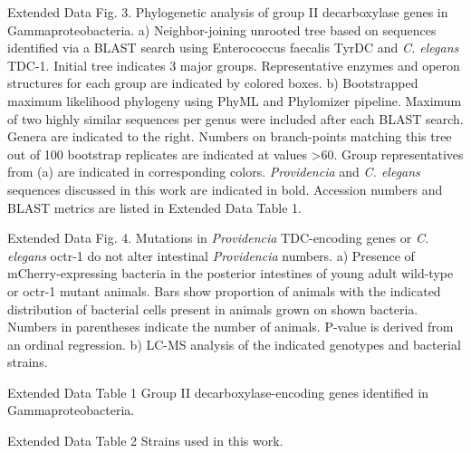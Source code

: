 \documentclass[]{article}
\begin{document}
Extended Data Fig. 3. Phylogenetic analysis of group II decarboxylase
genes in Gammaproteobacteria. a) Neighbor-joining unrooted tree based on
sequences identified via a BLAST search using Enterococcus faecalis
TyrDC and \textit{C. elegans} TDC-1. Initial tree indicates 3 major
groups. Representative enzymes and operon structures for each group are
indicated by colored boxes. b) Bootstrapped maximum likelihood phylogeny
using PhyML and Phylomizer pipeline. Maximum of two highly similar
sequences per genus were included after each BLAST search. Genera are
indicated to the right. Numbers on branch-points matching this tree out
of 100 bootstrap replicates are indicated at values \textgreater{}60.
Group representatives from (a) are indicated in corresponding colors.
\textit{Providencia} and \textit{C. elegans} sequences discussed in this
work are indicated in bold. Accession numbers and BLAST metrics are
listed in Extended Data Table 1.

Extended Data Fig. 4. Mutations in \textit{Providencia} TDC-encoding
genes or \textit{C. elegans} octr-1 do not alter intestinal
\textit{Providencia} numbers. a) Presence of mCherry-expressing bacteria
in the posterior intestines of young adult wild-type or octr-1 mutant
animals. Bars show proportion of animals with the indicated distribution
of bacterial cells present in animals grown on shown bacteria. Numbers
in parentheses indicate the number of animals. P-value is derived from
an ordinal regression. b) LC-MS analysis of the indicated genotypes and
bacterial strains.

Extended Data Table 1 Group II decarboxylase-encoding genes identified
in Gammaproteobacteria.

Extended Data Table 2 Strains used in this work.
\end{document}
